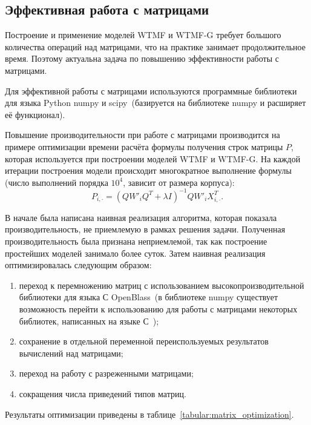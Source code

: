 
\subsection{Эффективная работа с матрицами}
    Построение и применение моделей WTMF и WTMF-G требует большого количества операций над матрицами, что на практике занимает продолжительное время.
    Поэтому актуальна задача по повышению эффективности работы с матрицами.

    Для эффективной работы с матрицами используются программные библиотеки для языка Python numpy и
    scipy~(базируется на библиотеке numpy и расширяет её функционал).

    Повышение производительности при работе с матрицами производится на примере оптимизации времени расчёта формулы получения строк матрицы $P$,
    которая используется при построении моделей WTMF и WTMF-G.
    На каждой итерации построения модели происходит многократное выполнение формулы (число выполнений порядка $10^4$, зависит от размера корпуса):
    \begin{equation}
        P_{i, \cdot} = (Q W'_i Q^T + \lambda I)^{-1} Q W'_i X_{i,\cdot}^T.
    \end{equation}

    В начале была написана наивная реализация алгоритма, которая показала производительность, не приемлемую в рамках решения задачи.
    Полученная производительность была признана неприемлемой, так как построение простейших моделей занимало более суток.
    Затем наивная реализация оптимизировалась следующим образом:
    \begin{enumerate}
        \item переход к перемножению матриц с использованием высокопроизводительной библиотеки для языка С OpenBlass~(в библиотеке numpy существует возможность перейти к использованию для работы с матрицами некоторых библиотек, написанных на языке С~\cite{blas_installation});
        \item сохранение в отдельной переменной переиспользуемых результатов вычислений над матрицами;
        \item переход на работу с разреженными матрицами;
        \item сокращения числа приведений типов матриц.
    \end{enumerate}
    Результаты оптимизации приведены в таблице~\ref{tabular:matrix_optimization}.

